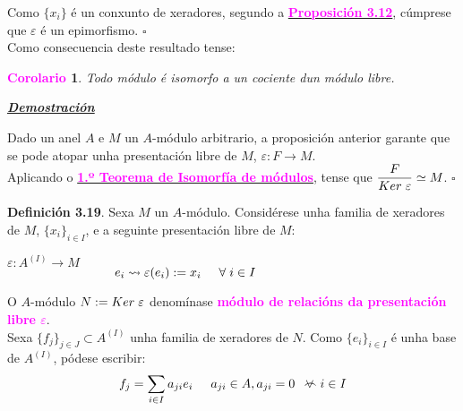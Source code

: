 \documentclass[twoside]{report}
\newcommand{\magbf}[1]{\textcolor{magenta}{\textbf{#1}}} %
\newcommand{\almostall}{\mathrel{\vee\mkern-19mu\frown}} %
\theoremstyle{mystyle}
\newtheorem{cor}{\magbf{Corolario}}[chapter]
\newenvironment{corollary}
{\begin{mdframed}[linecolor = magenta,backgroundcolor = classicrose, linewidth = 2mm]\begin{cor}}
{\end{cor}\end{mdframed}}
\begin{document}
\noindent Como $\{x_{i}\}$ é un conxunto de xeradores, segundo a \hyperref[prop3.12]{\magbf{Proposición 3.12}}, cúmprese que $\varepsilon$ é un epimorfismo. $\square$\\

\noindent Como consecuencia deste resultado tense:\\

\begin{corollary} \label{cor3.3}
Todo módulo é isomorfo a un cociente dun módulo libre.
\end{corollary}

\vspace{2mm}

\noindent \textbf{\textit{\underline{Demostración}}}

\vspace{2mm}

\noindent Dado un anel $A$ e $M$ un $A$-módulo arbitrario, a proposición anterior garante que se pode atopar unha presentación libre de $M$, $\varepsilon: F \longrightarrow M$.\\

\noindent Aplicando o \hyperref[th3.1]{\magbf{1.º Teorema de Isomorfía de módulos}}, tense que $\displaystyle \frac{F}{Ker \hspace{1mm} \varepsilon} \simeq M$. $\square$\\

\vspace{3mm}

\noindent \textbf{Definición 3.19}. Sexa $M$ un $A$-módulo. Considérese unha familia de xeradores de $M$, $\{x_{i}\}_{i \in I}$, e a seguinte presentación libre de $M$:
\begin{center}
    $\varepsilon: A^{(I)} \longrightarrow M$\\
    \vspace{2mm}
    $\hspace{30mm} e_{i} \leadsto \varepsilon(e_{i}) := x_{i} \hspace{5mm} \forall \hspace{1mm} i \in I$
\end{center}

\noindent O $A$-módulo $N := Ker \hspace{1mm} \varepsilon$ denomínase \magbf{módulo de relacións da presentación libre $\varepsilon$}. \\

\noindent Sexa $\{f_{j}\}_{j \in J} \subset A^{(I)}$ unha familia de xeradores de $N$. Como $\{e_{i}\}_{i \in I}$ é unha base de $A^{(I)}$, pódese escribir:
$$f_{j} = \displaystyle \sum_{i \in I} a_{ji}e_{i} \hspace{5mm} a_{ji} \in A, a_{ji} = 0 \hspace{2mm} \almostall i \in I$$
\end{document}
